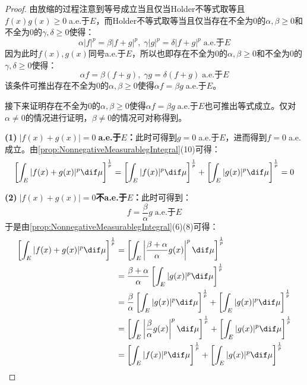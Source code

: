 \begin{proof}
	由放缩的过程注意到等号成立当且仅当Holder不等式取等且$f(x)g(x)\geqslant0\;$a.e.于$E$，而Holder不等式取等当且仅当存在不全为$0$的$\alpha,\beta\geqslant0$和不全为$0$的$\gamma,\delta\geqslant0$使得：
	\begin{equation*}
		\alpha|f|^p=\beta|f+g|^p,\;\gamma|g|^p=\delta|f+g|^p\;\text{a.e.于$E$}
	\end{equation*}
	因为此时$f(x),g(x)$同号a.e.于$E$，所以也即存在不全为$0$的$\alpha,\beta\geqslant0$和不全为$0$的$\gamma,\delta\geqslant0$使得：
	\begin{equation*}
		\alpha f=\beta (f+g),\;\gamma g=\delta(f+g)\;\text{a.e.于$E$}
	\end{equation*}
	该条件可推出存在不全为$0$的$\alpha,\beta\geqslant0$使得$\alpha f=\beta g\;$a.e.于$E$。\par
	接下来证明存在不全为$0$的$\alpha,\beta\geqslant0$使得$\alpha f=\beta g\;$a.e.于$E$也可推出等式成立。仅对$\alpha\ne0$的情况进行证明，$\beta\ne0$的情况可对称得到。\par
	\textbf{(1)$\;|f(x)+g(x)|=0\;$a.e.于$E$：}此时可得到$g=0\;$a.e.于$E$，进而得到$f=0\;$a.e.成立。由\cref{prop:NonnegativeMeasurablegIntegral}(10)可得：
	\begin{equation*}
		\left[\int_{E}^{}|f(x)+g(x)|^p\dif\mu\right]^\frac{1}{p}=\left[\int_{E}^{}|f(x)|^p\dif\mu\right]^\frac{1}{p}+\left[\int_{E}^{}|g(x)|^p\dif\mu\right]^\frac{1}{p}=0
	\end{equation*}\par
	\textbf{(2)$\;|f(x)+g(x)|=0$不a.e.于$E$：}此时可得到：
	\begin{equation*}
		f=\frac{\beta}{\alpha}g\;\text{a.e.于$E$}
	\end{equation*}
	于是由\cref{prop:NonnegativeMeasurablegIntegral}(6)(8)可得：
	\begin{align*}
		\left[\int_{E}^{}|f(x)+g(x)|^p\dif\mu\right]^{\frac{1}{p}}&=\left[\int_{E}^{}\left|\frac{\beta+\alpha}{\alpha}g(x)\right|^p\dif\mu\right]^\frac{1}{p} \\
		&=\frac{\beta+\alpha}{\alpha}\left[\int_{E}^{}|g(x)|^p\dif\mu\right]^\frac{1}{p} \\
		&=\frac{\beta}{\alpha}\left[\int_{E}^{}|g(x)|^p\dif\mu\right]^\frac{1}{p}+\left[\int_{E}^{}|g(x)|^p\dif\mu\right]^\frac{1}{p} \\
		&=\left[\int_{E}\left|\frac{\beta}{\alpha}g(x)\right|^p\dif\mu\right]^{\frac{1}{p}}+\left[\int_{E}^{}|g(x)|^p\dif\mu\right]^\frac{1}{p} \\
		&=\left[\int_{E}^{}|f(x)|^p\dif\mu\right]^\frac{1}{p}+\left[\int_{E}^{}|g(x)|^p\dif\mu\right]^\frac{1}{p}\qedhere
	\end{align*}
\end{proof}
